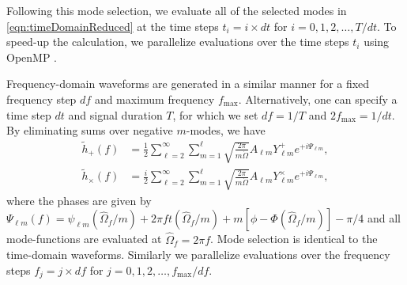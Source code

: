\documentclass[%
 reprint,
 nofootinbib,
 amsmath,amssymb,
 aps,
 prd,
]{revtex4-2}
\begin{document}
Following this mode selection, we evaluate all of the selected modes in \eqref{eqn:timeDomainReduced} at the time steps $t_i = i\times dt$ for $i = 0, 1, 2, \dots, T/dt$. To speed-up the calculation, we parallelize evaluations over the time steps $t_i$ using OpenMP \cite{OpenMP}.

Frequency-domain waveforms are generated in a similar manner for a fixed frequency step $df$ and maximum frequency $f_\mathrm{max}$. Alternatively, one can specify a time step $dt$ and signal duration $T$, for which we set $df = 1/T$ and $2f_\mathrm{max} = 1/dt$. By eliminating sums over negative $m$-modes, we have
\begin{align}
    \tilde{h}_+(f) &= \frac{1}{2}\sum_{\ell = 2}^\infty \sum_{m = 1}^{\ell} \sqrt{\frac{2\pi}{m\dot{\Omega}}}A_{\ell m} Y_{\ell m}^+ e^{+i\Psi_{\ell m}},
    \\
    \tilde{h}_\times(f) &= \frac{i}{2}\sum_{\ell = 2}^\infty \sum_{m = 1}^{\ell} \sqrt{\frac{2\pi}{m\dot{\Omega}}}A_{\ell m} Y_{\ell m}^\times e^{+i\Psi_{\ell m}},
\end{align}
where the phases are given by $\Psi_{\ell m}(f) = \psi_{\ell m}(\hat{\Omega}_f/m) + 2\pi f t(\hat{\Omega}_f/m) + m[\phi - \Phi(\hat{\Omega}_f/m)] - \pi/4$ and all mode-functions are evaluated at $\hat{\Omega}_f = 2\pi f$. Mode selection is identical to the time-domain waveforms. Similarly we parallelize evaluations over the frequency steps $f_j = j\times df$ for $j = 0, 1, 2, \dots, f_\mathrm{max}/df$.
\end{document}
